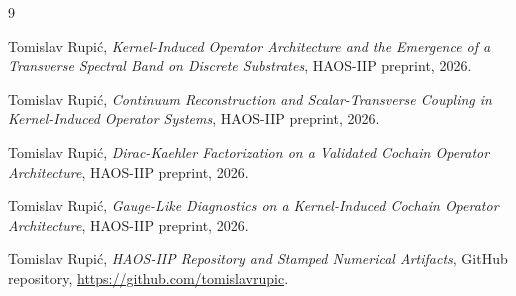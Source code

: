 \documentclass[11pt]{article}
\begin{document}
\begin{thebibliography}{9}

Tomislav Rupi\'c,
\newblock \emph{Kernel-Induced Operator Architecture and the Emergence of a Transverse Spectral Band on Discrete Substrates},
\newblock HAOS-IIP preprint, 2026.

Tomislav Rupi\'c,
\newblock \emph{Continuum Reconstruction and Scalar-Transverse Coupling in Kernel-Induced Operator Systems},
\newblock HAOS-IIP preprint, 2026.

Tomislav Rupi\'c,
\newblock \emph{Dirac-Kaehler Factorization on a Validated Cochain Operator Architecture},
\newblock HAOS-IIP preprint, 2026.

Tomislav Rupi\'c,
\newblock \emph{Gauge-Like Diagnostics on a Kernel-Induced Cochain Operator Architecture},
\newblock HAOS-IIP preprint, 2026.

Tomislav Rupi\'c,
\newblock \emph{HAOS-IIP Repository and Stamped Numerical Artifacts},
\newblock GitHub repository, \url{https://github.com/tomislavrupic}.

\end{thebibliography}
\end{document}
